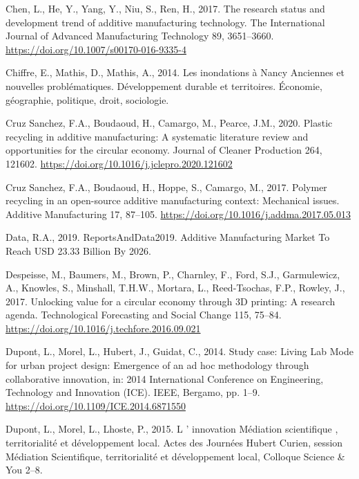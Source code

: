 \documentclass[
  11pt,
]{article}
\newlength{\cslhangindent}
\newlength{\cslentryspacingunit} %
\newenvironment{CSLReferences}[2] %
 {%
  \setlength{\parindent}{0pt}
  \ifodd #1
  \let\oldpar\par
  \def\par{\hangindent=\cslhangindent\oldpar}
  \fi
  \setlength{\parskip}{#2\cslentryspacingunit}
 }%
 {}
\begin{document}
\begin{CSLReferences}{1}{0}
\leavevmode{}%
Chen, L., He, Y., Yang, Y., Niu, S., Ren, H., 2017. The research status
and development trend of additive manufacturing technology. The
International Journal of Advanced Manufacturing Technology 89,
3651--3660. \url{https://doi.org/10.1007/s00170-016-9335-4}

\leavevmode{}%
Chiffre, E., Mathis, D., Mathis, A., 2014. {Les inondations à Nancy
\textendash{} Anciennes et nouvelles problématiques}. Développement
durable et territoires. Économie, géographie, politique, droit,
sociologie.

\leavevmode{}%
Cruz Sanchez, F.A., Boudaoud, H., Camargo, M., Pearce, J.M., 2020.
Plastic recycling in additive manufacturing: {A} systematic literature
review and opportunities for the circular economy. Journal of Cleaner
Production 264, 121602.
\url{https://doi.org/10.1016/j.jclepro.2020.121602}

\leavevmode{}%
Cruz Sanchez, F.A., Boudaoud, H., Hoppe, S., Camargo, M., 2017. Polymer
recycling in an open-source additive manufacturing context: {Mechanical}
issues. Additive Manufacturing 17, 87--105.
\url{https://doi.org/10.1016/j.addma.2017.05.013}

\leavevmode{}%
Data, R.A., 2019. {ReportsAndData2019}. Additive Manufacturing Market To
Reach USD 23.33 Billion By 2026.

\leavevmode{}%
Despeisse, M., Baumers, M., Brown, P., Charnley, F., Ford, S.J.,
Garmulewicz, A., Knowles, S., Minshall, T.H.W., Mortara, L.,
Reed-Tsochas, F.P., Rowley, J., 2017. Unlocking value for a circular
economy through {3D} printing: {A} research agenda. Technological
Forecasting and Social Change 115, 75--84.
\url{https://doi.org/10.1016/j.techfore.2016.09.021}

\leavevmode{}%
Dupont, L., Morel, L., Hubert, J., Guidat, C., 2014. Study case: {Living
Lab Mode} for urban project design: {Emergence} of an ad hoc methodology
through collaborative innovation, in: 2014 {International Conference} on
{Engineering}, {Technology} and {Innovation} ({ICE}). {IEEE}, {Bergamo},
pp. 1--9. \url{https://doi.org/10.1109/ICE.2014.6871550}

\leavevmode{}%
Dupont, L., Morel, L., Lhoste, P., 2015. L ' innovation {Médiation}
scientifique , territorialité et développement local. Actes des Journées
Hubert Curien, session Médiation Scientifique, territorialité et
développement local, Colloque Science \& You 2--8.


\end{CSLReferences}
\end{document}
